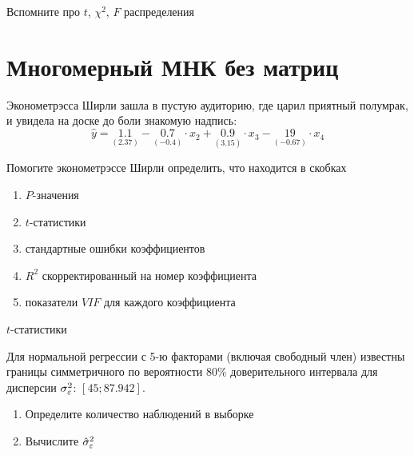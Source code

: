 \documentclass[pdftex,11pt,openany]{book}\usepackage[]{graphicx}\usepackage[]{color}
\begin{document}
\begin{solution}
Вспомните про $t$, $\chi^2$, $F$ распределения
\end{solution}


\chapter{Многомерный МНК без матриц}



\begin{problem}
 Эконометрэсса Ширли зашла в пустую аудиторию, где царил приятный полумрак, и увидела на доске до боли знакомую надпись:
\[
\hat{y}=\underset{(2.37)}{1.1}-\underset{(-0.4)}{0.7}\cdot x_2+\underset{(3.15)}{0.9}\cdot x_3-\underset{(-0.67)}{19}\cdot x_4
\]

Помогите эконометрэссе Ширли определить, что находится в скобках 
\begin{enumerate}
\item $P$-значения
\item $t$-статистики
\item стандартные ошибки коэффициентов
\item $R^2$ скорректированный на номер коэффициента
\item показатели $VIF$ для каждого коэффициента
\end{enumerate}
\end{problem}

\begin{solution}
$t$-статистики
\end{solution}

\begin{problem}
 Для нормальной регрессии с 5-ю факторами (включая свободный член) известны границы симметричного по вероятности 80$\%$ доверительного интервала для дисперсии $\sigma_{\varepsilon}^2$: $[45; 87.942]$.

\begin{enumerate}
\item Определите количество наблюдений в выборке
\item Вычислите $\hat{\sigma}_{\varepsilon}^2$
\end{enumerate}
\end{problem}
 
\end{document}
